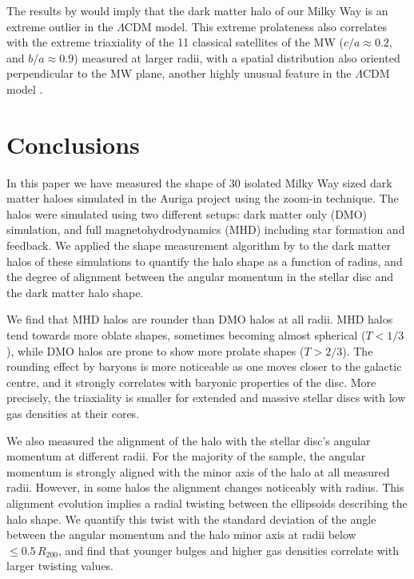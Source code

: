 \documentclass[usenatbib]{mnras}
\begin{document}
The results by \citet{LM10} would imply that the dark matter halo of our Milky
Way is an extreme outlier in the $\Lambda$CDM model. 
This extreme prolateness also correlates with the extreme triaxiality
of the 11 classical satellites of the MW ($c/a\approx 0.2$, and
$b/a\approx0.9$) measured at larger radii, with a spatial
distribution  also oriented perpendicular to the MW plane, another
highly unusual feature in the $\Lambda$CDM model \citep{2018MNRAS.478.5533F}. 






\section{Conclusions}
\label{sec:conclusions}

In this paper we have measured the shape of 30 isolated Milky Way sized
dark matter haloes simulated in the Auriga project using the zoom-in
technique. The halos were simulated using two different setups:
dark matter only (DMO) simulation, and full magnetohydrodynamics (MHD)
including star formation and feedback.
We applied the shape measurement algorithm by \cite{Allgood06} to the
dark matter halos of these simulations to quantify the halo shape as a
function of radius, and the degree of alignment between the angular
momentum in the stellar disc and the dark matter halo shape. 

We find that MHD halos are rounder than DMO halos at all radii.
MHD halos tend towards more oblate shapes, sometimes becoming almost spherical
($T<1/3$), while DMO halos are prone to show more prolate shapes ($T>2/3$).  
The rounding effect by baryons is more noticeable as one moves closer to the galactic
centre, and it strongly  correlates with baryonic properties of the disc.
More precisely, the triaxiality is smaller for extended and massive
stellar discs with low gas densities at their cores.

We also measured the alignment of the halo with the stellar disc's angular
momentum at different radii. For the majority of the sample, the angular momentum
is strongly aligned with the minor axis of the halo at all measured radii.
However, in some halos the alignment changes noticeably with radius. 
This alignment evolution implies a radial twisting between the ellipsoids
describing the halo shape. We quantify this twist with the standard deviation of the angle
between the angular momentum and the halo minor axis at radii below
$\leq 0.5\, R_{200}$, and find that younger bulges and higher gas
densities correlate with larger twisting values. 
\end{document}
